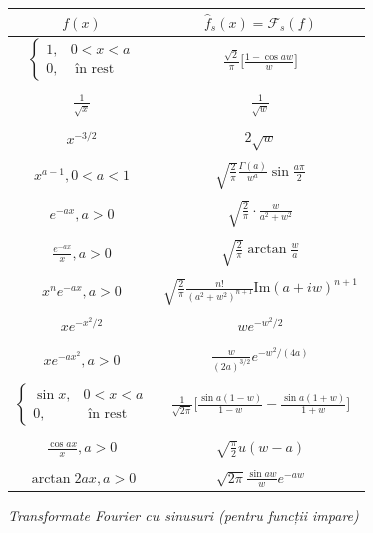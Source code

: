 \documentclass[12pt,a4paper]{article}
\newcommand\kal{\mathcal}
\theoremstyle{dotless}
\theoremstyle{dotlessdr}
\begin{document}

\newpage

\begin{figure}[!htbp]
  \centering
  \begin{tabular}{c|c}
    $ f(x) $ & $ \widehat{f}_s(x) = \kal{F}_s(f) $ \\
    \hline\hline
    $ \begin{cases} 1, & 0 < x < a \\ 0, & \text{ în rest} \end{cases} $ & $ \frac{\sqrt{2}}{\pi} \Big[ \frac{1 - \cos aw}{w} \Big] $ \\
             & \\
    $ \frac{1}{\sqrt{x}} $ & $ \frac{1}{\sqrt{w}} $ \\
             & \\
    $ x^{-3/2} $ & $ 2 \sqrt{w} $ \\
             & \\
    $  x^{a-1}, 0 < a < 1 $ & $ \sqrt{\frac{2}{\pi}} \frac{\Gamma(a)}{w^a} \sin\frac{a\pi}{2} $ \\
             & \\
    $ e^{-ax}, a > 0 $ & $ \sqrt{\frac{2}{\pi}} \cdot \frac{w}{a^2 + w^2} $ \\
             & \\
    $ \frac{e^{-ax}}{x}, a > 0 $ & $ \sqrt{\frac{2}{\pi}} \arctan \frac{w}{a} $ \\
             & \\
    $ x^n e^{-ax}, a > 0 $ & $ \sqrt{\frac{2}{\pi}} \frac{n!}{(a^2 + w^2)^{n+1}} \mathrm{Im}(a + iw)^{n + 1} $ \\
             & \\
    $ xe^{-x^2/2} $ & $ we^{-w^2/2} $ \\
             & \\
    $ xe^{-ax^2}, a > 0 $ & $ \frac{w}{(2a)^{3/2}} e^{-w^2/(4a)} $ \\
             & \\
    $ \begin{cases} \sin x, & 0 < x < a \\ 0, &\text{ în rest} \end{cases} $ & $ \frac{1}{\sqrt{2\pi}} \Big[ \frac{\sin a(1 - w)}{1 - w} - \frac{\sin a(1 + w)}{1 + w} \Big] $ \\
             & \\
    $ \frac{\cos ax}{x}, a > 0 $ & $ \sqrt{\frac{\pi}{2}} u(w - a) $ \\
             & \\
    $ \arctan{2a}{x}, a > 0 $ & $ \sqrt{2\pi} \frac{\sin aw}{w} e^{-aw} $ 
  \end{tabular}
  \caption{\emph{Transformate Fourier cu sinusuri (pentru funcții impare)}}
\end{figure}
\end{document}
